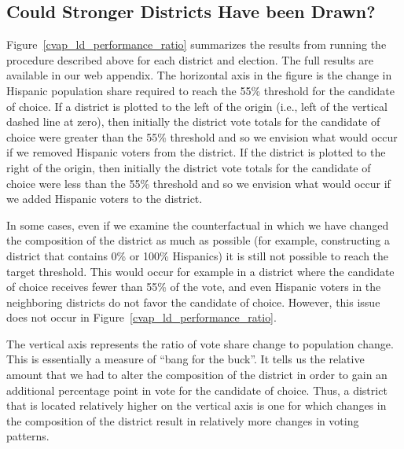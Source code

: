 \documentclass[12pt]{article}
\begin{document}
\subsection{Could Stronger Districts Have been Drawn?}

Figure~\ref{cvap_ld_performance_ratio} summarizes the results from
running the procedure described above for each district and election.
The full results are available in our web appendix. The horizontal
axis in the figure is the change in Hispanic population share required
to reach the 55\% threshold for the candidate of choice. If a district
is plotted to the left of the origin (i.e., left of the vertical
dashed line at zero), then initially the district vote totals for the
candidate of choice were greater than the 55\% threshold and so we
envision what would occur if we removed Hispanic voters from the
district. If the district is plotted to the right of the origin, then
initially the district vote totals for the candidate of choice were
less than the 55\% threshold and so we envision what would occur if we
added Hispanic voters to the district.

In some cases, even if we examine the counterfactual in which we have
changed the composition of the district as much as possible (for
example, constructing a district that contains 0\% or 100\% Hispanics)
it is still not possible to reach the target threshold. This would
occur for example in a district where the candidate of choice receives
fewer than 55\% of the vote, and even Hispanic voters in the
neighboring districts do not favor the candidate of choice. However,
this issue does not occur in Figure~\ref{cvap_ld_performance_ratio}.

The vertical axis represents the ratio of vote share change to
population change. This is essentially a measure of ``bang for the
buck''. It tells us the relative amount that we had to alter the
composition of the district in order to gain an additional percentage
point in vote for the candidate of choice. Thus, a district that is
located relatively higher on the vertical axis is one for which
changes in the composition of the district result in relatively more
changes in voting patterns.
\end{document}
